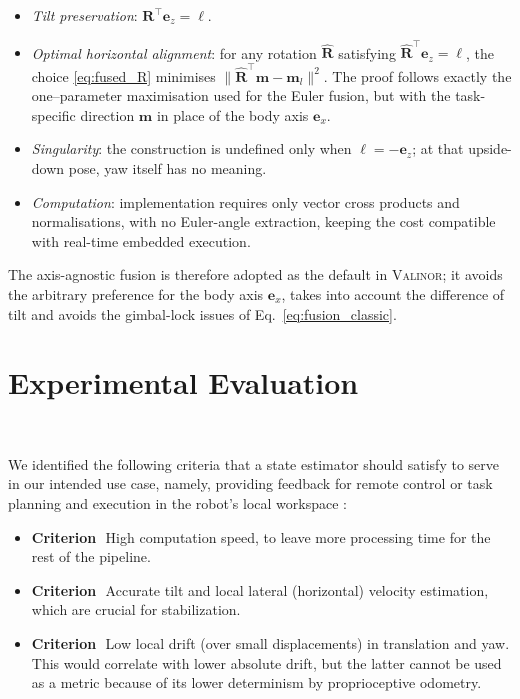 \documentclass{IJCAS}
\newcommand{\critnum}[1]{\tikz[baseline=(char.base)]{
            \node[shape=circle,draw,inner sep=1pt](char){\textbf{#1}};}}
\begin{document}
\begin{itemize}[leftmargin=0pt]
  \item \emph{Tilt preservation}:  
        \(\boldsymbol{R}^{\top}\boldsymbol{e}_{z}=\boldsymbol{\ell}\).

  \item \emph{Optimal horizontal alignment}:  
        for any rotation \(\hat{\boldsymbol{R}}\) satisfying
        \(\hat{\boldsymbol{R}}^{\top}\boldsymbol{e}_{z}=\boldsymbol{\ell}\),
        the choice \eqref{eq:fused_R} minimises $\bigl\|
             \hat{\boldsymbol{R}}^{\top}\boldsymbol{m}-\boldsymbol{m}_{l}
          \bigr\|^{2}$.
        The proof follows exactly the one–parameter maximisation used
        for the Euler fusion, but with the task-specific direction
        \(\boldsymbol{m}\) in place of the body axis
        \(\boldsymbol{e}_{x}\).

  \item \emph{Singularity}:  
        the construction is undefined only when
        \(\boldsymbol{\ell}=-\boldsymbol{e}_{z}\); at that upside-down
        pose, yaw itself has no meaning.

  \item \emph{Computation}:  
        implementation requires only vector cross products and
        normalisations, with no Euler-angle extraction, keeping the cost
        compatible with real-time embedded execution.
\end{itemize}

The axis-agnostic fusion is therefore adopted as the default in {\scshape Valinor}; it avoids the arbitrary preference for the body axis \(\boldsymbol{e}_{x}\), takes into account the difference of tilt and avoids the gimbal-lock issues of Eq.~\eqref{eq:fusion_classic}. 





\section{Experimental Evaluation}~\label{sec:exps}

We identified the following criteria that a state estimator should satisfy to serve in our intended use case, namely, providing feedback for remote control \cite{Grandia2024DesignControlBipedalRoboticCharacter} or task planning and execution in the robot's local workspace \cite{Tsuru2023OnlineMulticontactReplanningHumanoid}:
\begin{itemize}[label={}, leftmargin=1em]
  \item \textbf{Criterion}\,\critnum{1}\, High computation speed, to leave more processing time for the rest of the pipeline.
  \item \textbf{Criterion}\,\critnum{2}\, Accurate tilt and local lateral (horizontal) velocity estimation, which are crucial for stabilization.
  \item \textbf{Criterion}\,\critnum{3}\, Low local drift (over small displacements) in translation and yaw. This would correlate with lower absolute drift, but the latter cannot be used as a metric because of its lower determinism by proprioceptive odometry.
\end{itemize}
\end{document}
